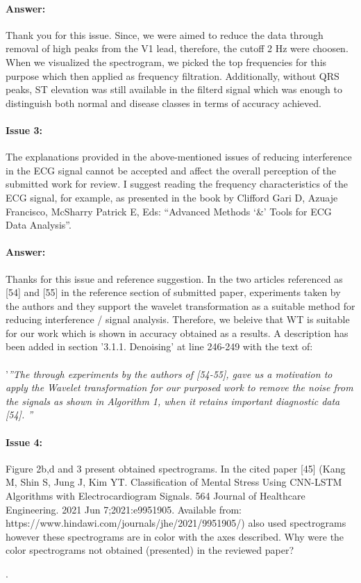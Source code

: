 \documentclass{article}
\begin{document}
\paragraph{Answer:}
Thank you for this issue. Since, we were aimed to reduce the data through removal of high peaks from the V1 lead, therefore, the cutoff 2 Hz were choosen. When we visualized the spectrogram, we picked the top frequencies for this purpose which then applied as frequency filtration. Additionally, without QRS peaks, ST elevation was still available in the filterd signal which was enough to distinguish both normal and disease classes in terms of accuracy achieved. 

\paragraph{Issue 3:}
\begin{displayquote}
The explanations provided in the above-mentioned issues of reducing interference in the ECG signal cannot be accepted and affect the overall perception of the submitted work for review. I suggest reading the frequency characteristics of the ECG signal, for example, as presented in the book by Clifford Gari D, Azuaje Francisco, McSharry Patrick E, Eds: ``Advanced Methods `\&' Tools for ECG Data Analysis''.
\end{displayquote}

\paragraph{Answer:}
Thanks for this issue and reference suggestion. In the two articles referenced as [54] and [55] in the reference section of submitted paper, experiments taken by the authors and they support the wavelet transformation as a suitable method for reducing interference / signal analysis. Therefore, we beleive that WT is suitable for our work which is shown in accuracy obtained as a results.
A description has been added in section '3.1.1. Denoising' at line 246-249 with the text of: \\\\ 
 '\textit{''The through experiments by the authors of [54-55], gave us a motivation to apply the Wavelet transformation for our purposed work to remove the noise from the signals as shown in Algorithm 1, when it retains important diagnostic data [54]. ''}

\paragraph{Issue 4:}
\begin{displayquote}
Figure 2b,d and 3 present obtained spectrograms. In the cited paper [45] (Kang M, Shin S, Jung J, Kim YT. Classification of Mental Stress Using CNN-LSTM Algorithms with Electrocardiogram Signals. 564 Journal of Healthcare Engineering. 2021 Jun 7;2021:e9951905. Available from: https://www.hindawi.com/journals/jhe/2021/9951905/) also used spectrograms however these spectrograms are in color with the axes described. Why were the color spectrograms not obtained (presented) in the reviewed paper? 
\end{displayquote}.
\end{document}

